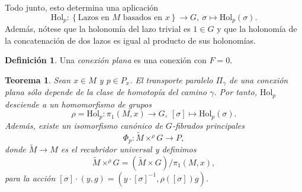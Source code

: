 \documentclass[11pt,a4paper]{amsbook}
\newtheorem{thm}[subsection]{Teorema}
\theoremstyle{remark} \newtheorem{rmk}[subsection]{Observación}
\theoremstyle{definition} \newtheorem{defn}[subsection]{Definición}
\theoremstyle{definition} \newtheorem{ex}[subsection]{Ejemplo}
\theoremstyle{definition} \newtheorem{ej}[subsection]{Ejercicio}
\begin{document}
Todo junto, esto determina una aplicación
\begin{equation*}
\mathrm{Hol}_p:\left\{ \text{Lazos en }M \text{ basados en }x \right\} \rightarrow G,\ \sigma \mapsto \mathrm{Hol}_p(\sigma).
\end{equation*}
Además, nótese que la holonomía del lazo trivial es $1\in G$ y que la holonomía de la concatenación de dos lazos es igual al producto de sus holonomías.

\begin{defn}
Una \emph{conexión plana} es una conexión con $F=0$.
\end{defn}

\begin{thm}
  Sean $x\in M$ y $p \in P_x$.
  El transporte paralelo $\Pi_\gamma$ de una conexión plana sólo depende de la clase de homotopía del camino $\gamma$. Por tanto, $\mathrm{Hol}_{p}$ desciende a un homomorfismo de grupos
  \begin{equation*}
\rho=\mathrm{Hol}_p: \pi_1(M,x) \rightarrow G,\ [\sigma] \mapsto \mathrm{Hol}_p(\sigma).
  \end{equation*}
  Además, existe un isomorfismo canónico de $G$-fibrados principales
  \begin{equation*}
\Phi_{p}: \widetilde{M} \times^{\rho} G \rightarrow P,
  \end{equation*}
  donde $\widetilde{M}\rightarrow M$ es el recubridor universal y definimos
  \begin{equation*}
\widetilde{M}\times^\rho G = (\widetilde{M} \times G)/\pi_1(M,x),
  \end{equation*}
para la acción $[\sigma]\cdot (y,g) = (y\cdot [\sigma]^{-1}, \rho([\sigma])g)$.
\end{thm}
\end{document}
